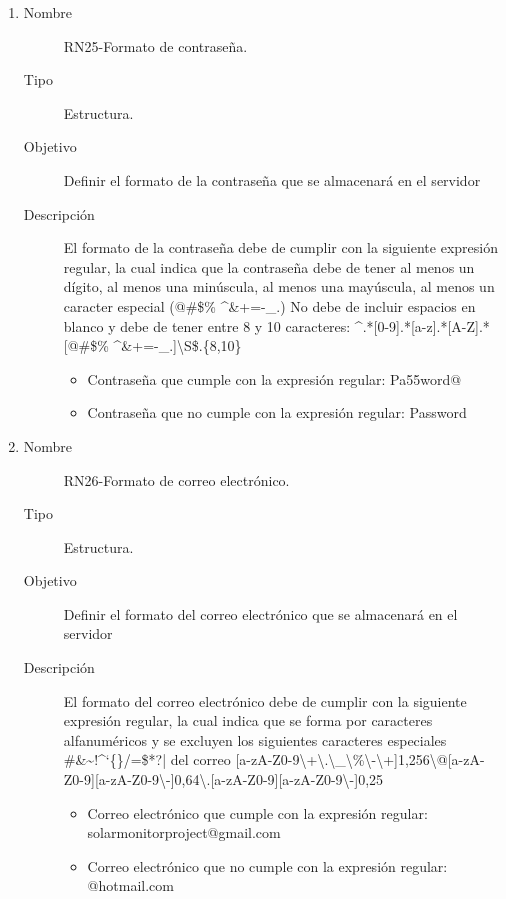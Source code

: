 \begin{enumerate}[label=RN\arabic*.]
\item \label{RN25}
		\begin{description}
			\item[Nombre] RN25-Formato de contraseña.
			\item[Tipo] Estructura.
			\item[Objetivo] Definir el formato de la contraseña que se almacenará en el servidor 
			\item[Descripción] 
			El formato de la contraseña debe de cumplir con la siguiente expresión regular, la cual indica que la contraseña debe de tener al menos un dígito, al menos una minúscula, al menos una mayúscula, al menos un caracter especial (@\#\$\%	\textasciicircum{}\&+=-\_.) 
			No debe de incluir espacios en blanco y debe de tener entre 8 y 10 caracteres: \textasciicircum{}.*[0-9].*[a-z].*[A-Z].*[@\#\$\%	\textasciicircum{}\&+=-\_.]\textbackslash{}S\$.\{8,10\}
			\begin{itemize}
		 		\item Contraseña que cumple con la expresión regular: Pa55word@
		 		\item Contraseña que no cumple con la expresión regular: Password
		    \end{itemize}
		\end{description}
		
\item \label{RN26}
		\begin{description}
			\item[Nombre] RN26-Formato de correo electrónico.
			\item[Tipo] Estructura.
			\item[Objetivo] Definir el formato del correo electrónico que se almacenará en el servidor 
			\item[Descripción] 
			El formato del correo electrónico debe de cumplir con la siguiente expresión regular, la cual indica que se forma por caracteres alfanuméricos y se excluyen los siguientes caracteres especiales \#\&\textasciitilde{}!\textasciicircum{}`\{\}/=\$*?| del correo [a-zA-Z0-9\textbackslash{}+\textbackslash{}.\textbackslash{}\_\textbackslash{}\%\textbackslash{}-\textbackslash{}+]{1,256}\textbackslash{}@[a-zA-Z0-9][a-zA-Z0-9\textbackslash{}-]{0,64}\textbackslash{}.[a-zA-Z0-9][a-zA-Z0-9\textbackslash{}-]{0,25}
			\begin{itemize}
		 		\item Correo electrónico que cumple con la expresión regular: solarmonitorproject@gmail.com
		 		\item Correo electrónico que no cumple con la expresión regular: @hotmail.com
		    \end{itemize}
		\end{description}
		
		
		
\end{enumerate}



